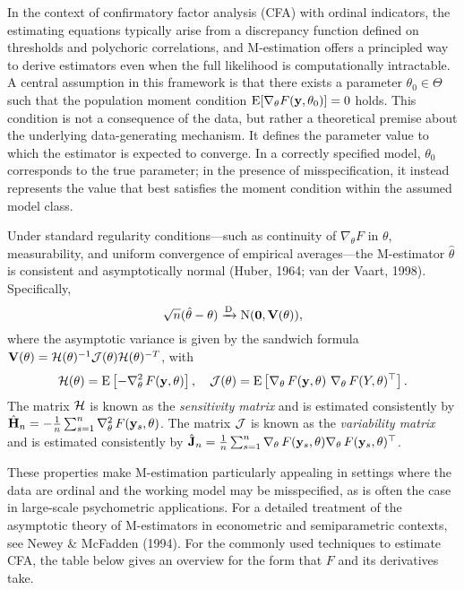 \documentclass[
  letterpaper,
  DIV=11,
  numbers=noendperiod]{scrartcl}
\begin{document}
In the context of confirmatory factor analysis (CFA) with ordinal
indicators, the estimating equations typically arise from a discrepancy
function defined on thresholds and polychoric correlations, and
M-estimation offers a principled way to derive estimators even when the
full likelihood is computationally intractable. A central assumption in
this framework is that there exists a parameter \(\theta_0 \in \Theta\)
such that the population moment condition
\(\operatorname{E}[\nabla_\theta F({\mathbf y}, \theta_0)] = 0\) holds. This condition is not
a consequence of the data, but rather a theoretical premise about the
underlying data-generating mechanism. It defines the parameter value to
which the estimator is expected to converge. In a correctly specified
model, \(\theta_0\) corresponds to the true parameter; in the presence
of misspecification, it instead represents the value that best satisfies
the moment condition within the assumed model class.

Under standard regularity conditions---such as continuity of
\(\nabla_\theta F\) in \(\theta\), measurability, and uniform
convergence of empirical averages---the M-estimator \(\hat\theta\) is
consistent and asymptotically normal (Huber, 1964; van der Vaart, 1998).
Specifically, \[
\sqrt{n}(\hat\theta - \theta) \xrightarrow{\text D} \operatorname{N}({\mathbf 0}, {\mathbf V}(\theta)),
\] where the asymptotic variance is given by the sandwich formula
\({\mathbf V}(\theta) = {\mathcal H}(\theta)^{-1} {\mathcal J}(\theta) {\mathcal H}(\theta)^{-T}\), with \[
{\mathcal H}(\theta) = \operatorname{E} \left[ - \nabla_\theta^2 \, F({\mathbf y},\theta) \right], \quad
{\mathcal J}(\theta) = \operatorname{E} \left[ \nabla_\theta \,F({\mathbf y},\theta) \ \nabla_\theta \, F(Y,\theta) ^\top \right].
\] The matrix \({\mathcal H}\) is known as the \emph{sensitivity matrix} and is
estimated consistently by
\(\hat{{\mathbf H}}_n = -\frac{1}{n} \sum_{s=1}^n \nabla_\theta^2 \, F({\mathbf y}_s, \theta)\).
The matrix \({\mathcal J}\) is known as the \emph{variability matrix} and is
estimated consistently by
\(\hat{{\mathbf J}}_n = \frac{1}{n} \sum_{s=1}^n \nabla_\theta \, F({\mathbf y}_s, \theta) \nabla_\theta \, F({\mathbf y}_s, \theta)^\top\).

These properties make M-estimation particularly appealing in settings
where the data are ordinal and the working model may be misspecified, as
is often the case in large-scale psychometric applications. For a
detailed treatment of the asymptotic theory of M-estimators in
econometric and semiparametric contexts, see Newey \& McFadden (1994).
For the commonly used techniques to estimate CFA, the table below gives
an overview for the form that \(F\) and its derivatives take.

\begin{table}

\caption{\label{tbl-objfun-deriv}}


\end{table}%
\end{document}

